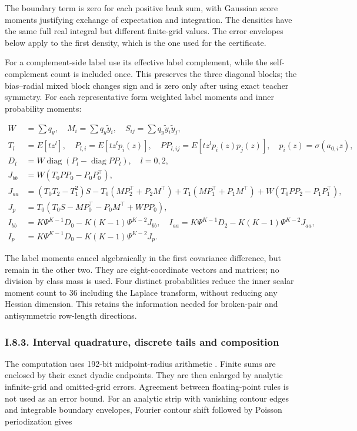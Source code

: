 \documentclass{article}
\begin{document}
The boundary term is zero for each positive bank sum, with Gaussian
score moments justifying exchange of expectation and integration. The
densities have the same full real integral but different finite-grid
values. The error envelopes below apply to the first density, which is
the one used for the certificate.

For a complement-side label use its effective label complement, while
the self-complement count is included once. This preserves the three
diagonal blocks; the bias--radial mixed block changes sign and is zero
only after using exact teacher symmetry. For each representative form
weighted label moments and inner probability moments:

\[
\begin{aligned}
W&=\sum q_y,\quad M_i=\sum q_y\widetilde y_i,\quad S_{ij}=\sum q_y\widetilde y_i\widetilde y_j,\\
T_l&=E[tz^l],\quad P_{l,i}=E[tz^lp_i(z)],\quad PP_{l,ij}=E[tz^lp_i(z)p_j(z)],\quad p_i(z)=\sigma(a_{0,i}z),\\
D_l&=W\operatorname{diag}(P_l-\operatorname{diag}PP_l),\quad l=0,2,\\
J_{bb}&=W(T_0PP_0-P_0P_0^\top),\\
J_{aa}&=(T_0T_2-T_1^2)S-T_0(MP_2^\top+P_2M^\top)
+T_1(MP_1^\top+P_1M^\top)+W(T_0PP_2-P_1P_1^\top),\\
J_p&=T_0(T_0S-MP_0^\top-P_0M^\top+WPP_0),\\
I_{bb}&=K\Psi^{K-1}D_0-K(K-1)\Psi^{K-2}J_{bb},\quad
I_{aa}=K\Psi^{K-1}D_2-K(K-1)\Psi^{K-2}J_{aa},\\
I_p&=K\Psi^{K-1}D_0-K(K-1)\Psi^{K-2}J_p.
\end{aligned}
\tag{I.26}
\]

The label moments cancel algebraically in the first covariance
difference, but remain in the other two. They are eight-coordinate
vectors and matrices; no division by class mass is used. Four distinct
probabilities reduce the inner scalar moment count to 36 including the
Laplace transform, without reducing any Hessian dimension. This retains
the information needed for broken-pair and antisymmetric row-length
directions.

\subsubsection*{I.8.3. Interval quadrature, discrete tails and
composition}\label{i.8.3.-interval-quadrature-discrete-tails-and-composition}

The computation uses 192-bit midpoint-radius arithmetic
\citep{johansson2017}. Finite sums are enclosed by their exact dyadic
endpoints. They are then enlarged by analytic infinite-grid and
omitted-grid errors. Agreement between floating-point rules is not used
as an error bound. For an analytic strip with vanishing contour edges
and integrable boundary envelopes, Fourier contour shift followed by
Poisson periodization gives \citep{trefethen2014}
\end{document}
